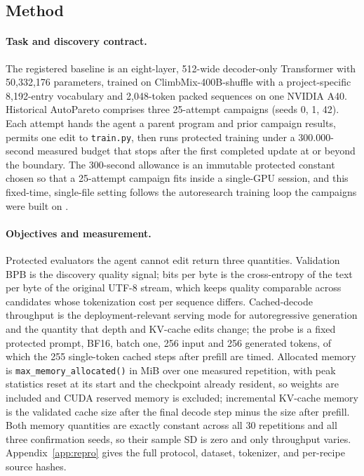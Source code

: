 \documentclass{article}
\begin{document}
\subsection{Method}
\paragraph{Task and discovery contract.} The registered baseline is an eight-layer, 512-wide decoder-only Transformer with 50,332,176 parameters, trained on ClimbMix-400B-shuffle with a project-specific 8,192-entry vocabulary and 2,048-token packed sequences on one NVIDIA A40. Historical AutoPareto comprises three 25-attempt campaigns (seeds 0, 1, 42). Each attempt hands the agent a parent program and prior campaign results, permits one edit to \texttt{train.py}, then runs protected training under a 300.000-second measured budget that stops after the first completed update at or beyond the boundary. The 300-second allowance is an immutable protected constant chosen so that a 25-attempt campaign fits inside a single-GPU session, and this fixed-time, single-file setting follows the autoresearch training loop the campaigns were built on \citep{autoresearch}.

\paragraph{Objectives and measurement.} Protected evaluators the agent cannot edit return three quantities. Validation BPB is the discovery quality signal; bits per byte is the cross-entropy of the text per byte of the original UTF-8 stream, which keeps quality comparable across candidates whose tokenization cost per sequence differs. Cached-decode throughput is the deployment-relevant serving mode for autoregressive generation and the quantity that depth and KV-cache edits change; the probe is a fixed protected prompt, BF16, batch one, 256 input and 256 generated tokens, of which the 255 single-token cached steps after prefill are timed. Allocated memory is \texttt{max\_memory\_allocated()} in MiB over one measured repetition, with peak statistics reset at its start and the checkpoint already resident, so weights are included and CUDA reserved memory is excluded; incremental KV-cache memory is the validated cache size after the final decode step minus the size after prefill. Both memory quantities are exactly constant across all 30 repetitions and all three confirmation seeds, so their sample SD is zero and only throughput varies. Appendix~\ref{app:repro} gives the full protocol, dataset, tokenizer, and per-recipe source hashes.
\end{document}
